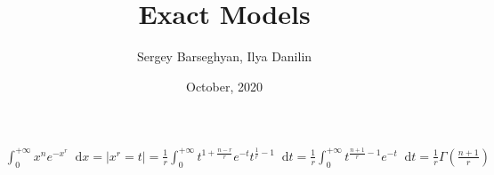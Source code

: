 \documentclass{article}
\title{Exact Models}
\author{Sergey Barseghyan, Ilya Danilin}
\date{October, 2020}
\newcommand*\diff{\mathop{}\!\mathrm{d}}
\begin{document}
\maketitle

\begin{equation}
\begin{aligned}
    \int_{0}^{+\infty} x^n e^{-x^r} \diff x = \left| x^r = t \right| = \frac{1}{r} \int_{0}^{+\infty} t^{1+\frac{n-r}{r}} e^{-t} t^{\frac{1}{r} -1} \diff t
    =  \frac{1}{r} \int_{0}^{+\infty} t^{\frac{n+1}{r}-1} e^{-t} \diff t =  \frac{1}{r} \Gamma\left({\frac{n+1}{r}}\right)
\end{aligned}
\end{equation}
\end{document}
